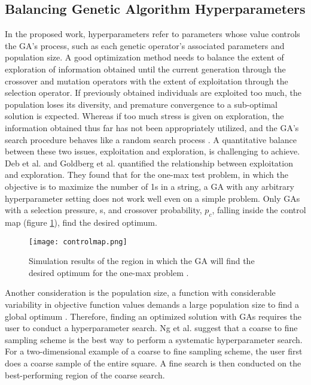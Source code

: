 \subsection{Balancing Genetic Algorithm Hyperparameters}
In the proposed work, hyperparameters refer to parameters whose value controls 
the \gls{GA}'s process, such as each genetic operator's associated parameters 
and population size.  
A good optimization method needs to balance the extent of exploration of 
information obtained until the current generation through the crossover 
and mutation operators with the extent of exploitation through the selection
operator. 
If previously obtained individuals are exploited too much, the population loses 
its diversity, and premature convergence to a sub-optimal solution is expected. 
Whereas if too much stress is given on exploration, the information obtained 
thus far has not been appropriately utilized, and the \gls{GA}'s search procedure 
behaves like a random search process \cite{deb_multi-objective_2001}. 
A quantitative balance between these two issues, exploitation and exploration, 
is challenging to achieve. 
Deb et al. \cite{deb_multi-objective_2001} and Goldberg et al. 
\cite{goldberg_toward_1993} quantified the relationship between exploitation 
and exploration. 
They found that for the one-max test problem, in which the objective is to 
maximize the number of 1s in a string, a \gls{GA} with any arbitrary 
hyperparameter setting does not work well even on a simple problem. 
Only \glspl{GA} with a selection pressure, s, and crossover probability, $p_c$, 
falling inside the control map (figure \ref{fig:controlmap}), find the desired 
optimum.  


\begin{figure}[H]
    \centering
    \texttt{[image: controlmap.png]} 
    \caption{Simulation results of the region in which the \gls{GA} will find the 
    desired optimum for the one-max problem 
    \cite{goldberg_toward_1993,deb_multi-objective_2001}.}
    \label{fig:controlmap}
\end{figure}

Another consideration is the population size, a function with considerable 
variability in objective function values demands a large population size to 
find a global optimum \cite{deb_multi-objective_2001}. 
Therefore, finding an optimized solution with \glspl{GA} requires the user 
to conduct a hyperparameter search. 
Ng et al. \cite{ng_improving_2021} suggest that a coarse to fine sampling scheme 
is the best way to perform a systematic hyperparameter search.  
For a two-dimensional example of a coarse to fine sampling scheme, the user 
first does a coarse sample of the entire square. 
A fine search is then conducted on the best-performing region of the coarse 
search. 

